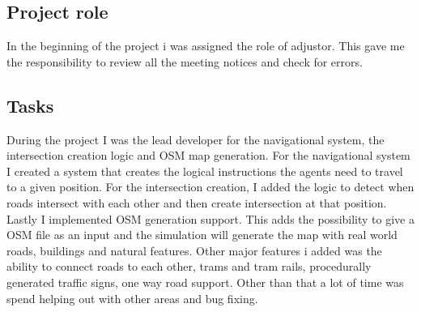 \subsection{Project role}
In the beginning of the project i was assigned the role of adjustor. This gave me the responsibility to review all the meeting notices and check for errors.
    
\subsection{Tasks}
    During the project I was the lead developer for the navigational system, the intersection creation logic and OSM map generation. For the navigational system I created a system that creates the logical instructions the agents need to travel to a given position. For the intersection creation, I added the logic to detect when roads intersect with each other and then create intersection at that position. Lastly I implemented OSM generation support. This adds the possibility to give a OSM file as an input and the simulation will generate the map with real world roads, buildings and natural features.
    Other major features i added was the ability to connect roads to each other, trams and tram rails, procedurally generated traffic signs, one way road support. Other than that a lot of time was spend helping out with other areas and bug fixing.


